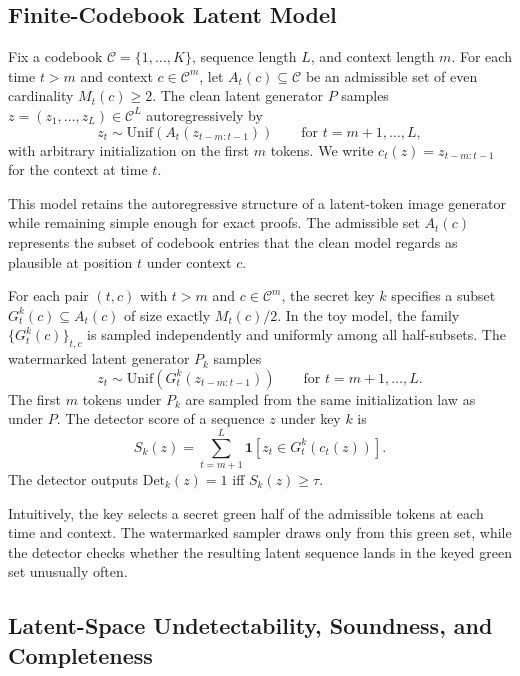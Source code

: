 \documentclass[12pt]{article}
\newcommand{\cC}{\mathcal{C}}
\newcommand{\Unif}{\mathrm{Unif}}
\begin{document}
\subsection{Finite-Codebook Latent Model}

\begin{definition}
Fix a codebook $\cC=\{1,\dots,K\}$, sequence length $L$, and context
length $m$. For each time $t>m$ and context $c\in \cC^m$, let
$A_t(c)\subseteq \cC$ be an admissible set of even cardinality
$M_t(c)\ge 2$. The clean latent generator $P$ samples
$z=(z_1,\dots,z_L)\in \cC^L$ autoregressively by
\[
z_t \sim \Unif(A_t(z_{t-m:t-1})) \qquad \text{for } t=m+1,\dots,L,
\]
with arbitrary initialization on the first $m$ tokens. We write
$c_t(z)=z_{t-m:t-1}$ for the context at time $t$.
\end{definition}

This model retains the autoregressive structure of a latent-token image
generator while remaining simple enough for exact proofs. The admissible
set $A_t(c)$ represents the subset of codebook entries that the clean
model regards as plausible at position $t$ under context $c$.

\begin{definition}
For each pair $(t,c)$ with $t>m$ and $c\in\cC^m$, the secret key $k$
specifies a subset $G_t^k(c)\subseteq A_t(c)$ of size exactly
$M_t(c)/2$. In the toy model, the family $\{G_t^k(c)\}_{t,c}$ is
sampled independently and uniformly among all half-subsets. The
watermarked latent generator $P_k$ samples
\[
z_t \sim \Unif(G_t^k(z_{t-m:t-1})) \qquad \text{for } t=m+1,\dots,L.
\]
The first $m$ tokens under $P_k$ are sampled from the same
initialization law as under $P$.
The detector score of a sequence $z$ under key $k$ is
\[
S_k(z)=\sum_{t=m+1}^L \mathbf{1}\!\left[z_t\in G_t^k(c_t(z))\right].
\]
The detector outputs $\mathrm{Det}_k(z)=1$ iff $S_k(z)\ge \tau$.
\end{definition}

Intuitively, the key selects a secret green half of the admissible
tokens at each time and context. The watermarked sampler draws only from
this green set, while the detector checks whether the resulting latent
sequence lands in the keyed green set unusually often.

\subsection{Latent-Space Undetectability, Soundness, and Completeness}
\end{document}
